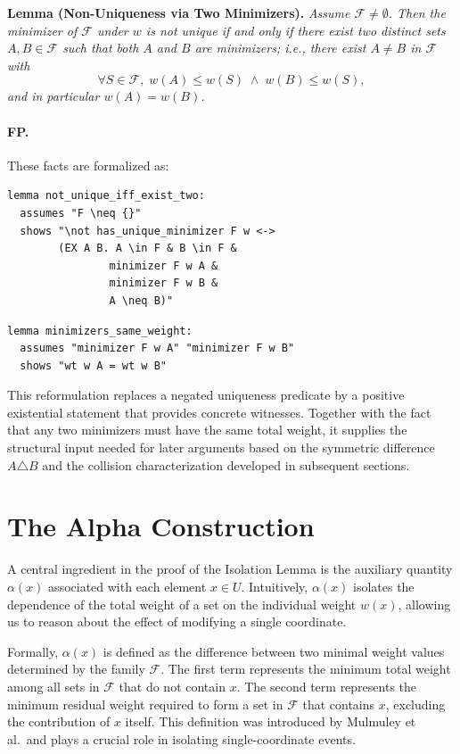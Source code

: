\noindent
\textbf{Lemma (Non-Uniqueness via Two Minimizers).}
\emph{Assume $\mathcal{F} \neq \emptyset$. Then the minimizer of $\mathcal{F}$ under $w$ is not unique if and only if there exist two distinct sets $A, B \in \mathcal{F}$ such that both $A$ and $B$ are minimizers; i.e., there exist $A \neq B$ in $\mathcal{F}$ with
\[
\forall S \in \mathcal{F},\; w(A) \le w(S) \;\land\; w(B) \le w(S),
\]
and in particular $w(A) = w(B)$.}

\paragraph{FP.}
These facts are formalized as:

\begin{lstlisting}[language=Isabelle, caption={Non-Uniqueness Characterization}]
lemma not_unique_iff_exist_two:
  assumes "F \neq {}"
  shows "\not has_unique_minimizer F w <-> 
        (EX A B. A \in F & B \in F &
                minimizer F w A & 
                minimizer F w B &
                A \neq B)"
\end{lstlisting}

\begin{lstlisting}[language=Isabelle, caption={Minimizers Have Equal Weight}]
lemma minimizers_same_weight:
  assumes "minimizer F w A" "minimizer F w B"
  shows "wt w A = wt w B"
\end{lstlisting}

This reformulation replaces a negated uniqueness predicate by a positive existential statement that provides concrete witnesses.
Together with the fact that any two minimizers must have the same total weight, it supplies the structural input needed for later arguments based on the symmetric difference \(A \triangle B\) and the collision characterization developed in subsequent sections.

\section{The Alpha Construction}
\label{sec:alpha}

A central ingredient in the proof of the Isolation Lemma is the auxiliary quantity $\alpha(x)$ associated with each element $x \in U$.
Intuitively, $\alpha(x)$ isolates the dependence of the total weight of a set on the individual weight $w(x)$, allowing us to reason about the effect of modifying a single coordinate.

Formally, $\alpha(x)$ is defined as the difference between two minimal weight values determined by the family $\mathcal{F}$.
The first term represents the minimum total weight among all sets in $\mathcal{F}$ that do not contain $x$.
The second term represents the minimum residual weight required to form a set in $\mathcal{F}$ that contains $x$, excluding the contribution of $x$ itself.
This definition was introduced by Mulmuley et al.\ and plays a crucial role in isolating single-coordinate events.

